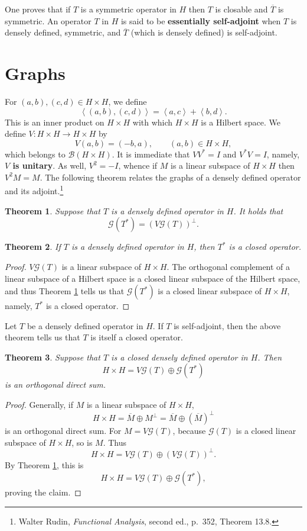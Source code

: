 \documentclass{article}
\newcommand{\inner}[2]{\left\langle #1, #2 \right\rangle}
\newtheorem{theorem}{Theorem}
\theoremstyle{definition}
\begin{document}
One proves that if $T$ is a symmetric operator in $H$ then $T$ is closable and $\overline{T}$ is symmetric.
An operator $T$ in $H$ is said to be \textbf{essentially self-adjoint} when $T$ is densely defined, symmetric, and
$\overline{T}$ (which is densely defined) is self-adjoint.

\section{Graphs}
For $(a,b), (c,d) \in H \times H$, we define 
\[
\inner{(a,b)}{(c,d)} = \inner{a}{c}+\inner{b}{d}.
\]
This is an inner product on $H \times H$ with which $H \times H$ is a Hilbert space. 
We define $V:H \times H \to H \times H$ by
\[
V(a,b) = (-b,a), \qquad (a,b) \in H \times H,
\]
which belongs to $\mathscr{B}(H \times H)$. It is immediate that $VV^*=I$ and $V^*V=I$, namely, 
\textbf{$V$ is unitary}. As well, $V^2=-I$, whence if $M$ is a linear subspace of $H \times H$ then $V^2 M=M$. 
The following theorem relates the graphs of a densely defined operator and its adjoint.\footnote{Walter
Rudin, {\em Functional Analysis}, second ed., p.~352, Theorem 13.8.}

\begin{theorem}
Suppose that $T$ is a densely defined operator in $H$. It holds that
\[
\mathscr{G}(T^*) = \left( V \mathscr{G}(T) \right)^\perp.
\]
\label{perp}
\end{theorem}


\begin{theorem}
If $T$ is a densely defined operator in $H$, then $T^*$ is a closed operator.
\label{adjointclosed}
\end{theorem}
\begin{proof}
$V \mathscr{G}(T)$ is a linear subspace of $H \times H$. 
The orthogonal complement of a linear subspace of a Hilbert space is a closed linear subspace of the Hilbert space, and thus
Theorem \ref{perp} tells us that $\mathscr{G}(T^*)$ is a closed linear subspace of $H \times H$, namely,
$T^*$ is a closed operator.
\end{proof}

Let $T$ be a densely defined operator in $H$. If $T$ is self-adjoint, then the above theorem tells us that
$T$ is itself a closed operator. 


\begin{theorem}
Suppose that $T$ is a closed densely defined  operator in $H$. Then
\[
H \times H = V\mathscr{G}(T) \oplus \mathscr{G}(T^*)
\]
is an orthogonal direct sum.
\end{theorem}
\begin{proof}
Generally, if $M$ is a linear subspace of $H \times H$,
\[
H \times H = \overline{M} \oplus M^\perp = \overline{M} \oplus (\overline{M})^\perp
\]
is an orthogonal direct sum. For $M = V \mathscr{G}(T)$, because $\mathscr{G}(T)$ is a closed linear subspace of $H \times H$, so
is $M$. Thus
\[
H \times H = V \mathscr{G}(T) \oplus (V \mathscr{G}(T))^\perp.
\]
By Theorem \ref{perp}, this is
\[
H \times H = V \mathscr{G}(T) \oplus \mathscr{G}(T^*),
\]
proving the claim.
\end{proof}
\end{document}
